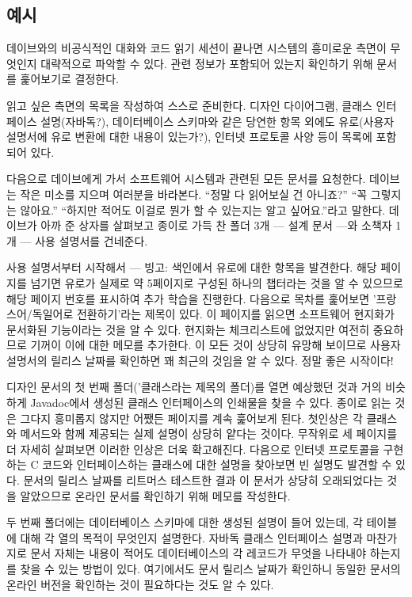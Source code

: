 \documentclass[a4paper,10pt,twoside]{book}
\begin{document}
\subsection*{예시}

데이브와의 비공식적인 대화와 코드 읽기 세션이 끝나면 시스템의 흥미로운 측면이 무엇인지 대략적으로 파악할 수 있다. 관련 정보가 포함되어 있는지 확인하기 위해 문서를 훑어보기로 결정한다.

읽고 싶은 측면의 목록을 작성하여 스스로 준비한다. 디자인 다이어그램, 클래스 인터페이스 설명(자바독?), 데이터베이스 스키마와 같은 당연한 항목 외에도 유로(사용자 설명서에 유로 변환에 대한 내용이 있는가?), 인터넷 프로토콜 사양 등이 목록에 포함되어 있다.

다음으로 데이브에게 가서 소프트웨어 시스템과 관련된 모든 문서를 요청한다. 데이브는 작은 미소를 지으며 여러분을 바라본다. ``정말 다 읽어보실 건 아니죠?'' ``꼭 그렇지는 않아요.'' ``하지만 적어도 이걸로 뭔가 할 수 있는지는 알고 싶어요.''라고 말한다. 데이브가 아까 준 상자를 살펴보고 종이로 가득 찬 폴더 3개 --- 설계 문서 ---와 소책자 1개 --- 사용 설명서를 건네준다.

사용 설명서부터 시작해서 --- 빙고: 색인에서 유로에 대한 항목을 발견한다. 해당 페이지를 넘기면 유로가 실제로 약 5페이지로 구성된 하나의 챕터라는 것을 알 수 있으므로 해당 페이지 번호를 표시하여 추가 학습을 진행한다. 다음으로 목차를 훑어보면 '프랑스어/독일어로 전환하기'라는 제목이 있다. 이 페이지를 읽으면 소프트웨어 현지화가 문서화된 기능이라는 것을 알 수 있다. 현지화는 체크리스트에 없었지만 여전히 중요하므로 기꺼이 이에 대한 메모를 추가한다. 이 모든 것이 상당히 유망해 보이므로 사용자 설명서의 릴리스 날짜를 확인하면 꽤 최근의 것임을 알 수 있다. 정말 좋은 시작이다!

디자인 문서의 첫 번째 폴더('클래스라는 제목의 폴더)를 열면 예상했던 것과 거의 비슷하게 Javadoc에서 생성된 클래스 인터페이스의 인쇄물을 찾을 수 있다. 종이로 읽는 것은 그다지 흥미롭지 않지만 어쨌든 페이지를 계속 훑어보게 된다. 첫인상은 각 클래스와 메서드와 함께 제공되는 실제 설명이 상당히 얕다는 것이다. 무작위로 세 페이지를 더 자세히 살펴보면 이러한 인상은 더욱 확고해진다. 다음으로 인터넷 프로토콜을 구현하는 C 코드와 인터페이스하는 클래스에 대한 설명을 찾아보면 빈 설명도 발견할 수 있다. 문서의 릴리스 날짜를 리트머스 테스트한 결과 이 문서가 상당히 오래되었다는 것을 알았으므로 온라인 문서를 확인하기 위해 메모를 작성한다.

두 번째 폴더에는 데이터베이스 스키마에 대한 생성된 설명이 들어 있는데, 각 테이블에 대해 각 열의 목적이 무엇인지 설명한다. 자바독 클래스 인터페이스 설명과 마찬가지로 문서 자체는 내용이 적어도 데이터베이스의 각 레코드가 무엇을 나타내야 하는지를 찾을 수 있는 방법이 있다. 여기에서도 문서 릴리스 날짜가 확인하니 동일한 문서의 온라인 버전을 확인하는 것이 필요하다는 것도 알 수 있다.
\end{document}
